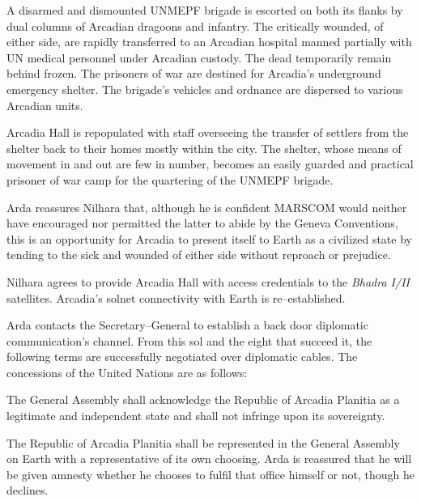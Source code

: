 

A disarmed and dismounted UNMEPF brigade is escorted on both its flanks by dual columns of Arcadian dragoons and infantry. The critically wounded, of either side, are rapidly transferred to an Arcadian hospital manned partially with UN medical personnel under Arcadian custody. The dead temporarily remain behind frozen. The prisoners of war are destined for Arcadia's underground emergency shelter. The brigade's vehicles and ordnance are dispersed to various Arcadian units.

Arcadia Hall is repopulated with staff overseeing the transfer of settlers from the shelter back to their homes mostly within the city. The shelter, whose means of movement in and out are few in number, becomes an easily guarded and practical prisoner of war camp for the quartering of the UNMEPF brigade.

Arda reassures Nilhara that, although he is confident MARSCOM would neither have encouraged nor permitted the latter to abide by the Geneva Conventions, this is an opportunity for Arcadia to present itself to Earth as a civilized state by tending to the sick and wounded of either side without reproach or prejudice.
\StopTimelineDate

Nilhara agrees to provide Arcadia Hall with access credentials to the {\it Bhadra I/II} satellites. Arcadia's solnet connectivity with Earth is re--established.

Arda contacts the Secretary--General to establish a back door diplomatic communication's channel. From this sol and the eight that succeed it, the following terms are successfully negotiated over diplomatic cables. The concessions of the United Nations are as follows:

\startitemize[R]
\item The General Assembly shall acknowledge the Republic of Arcadia Planitia as a legitimate and independent state and shall not infringe upon its sovereignty.

\item The Republic of Arcadia Planitia shall be represented in the General Assembly on Earth with a representative of its own choosing. Arda is reassured that he will be given amnesty whether he chooses to fulfil that office himself or not, though he declines.

